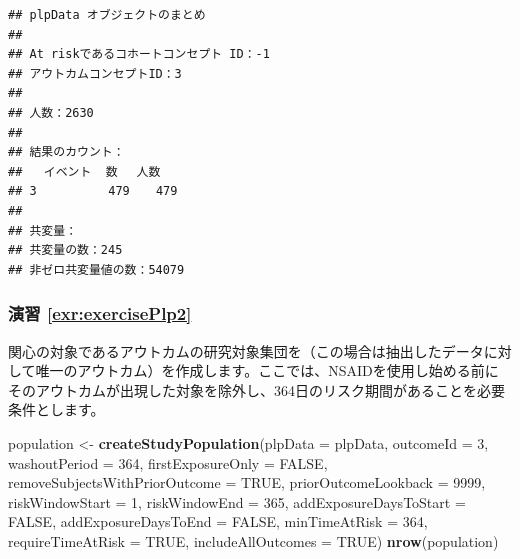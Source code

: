 \documentclass[
  11pt]{book}
\newenvironment{Shaded}{\begin{snugshade}}{\end{snugshade}}
\newcommand{\AttributeTok}[1]{\textcolor[rgb]{0.13,0.29,0.53}{#1}}
\newcommand{\ConstantTok}[1]{\textcolor[rgb]{0.56,0.35,0.01}{#1}}
\newcommand{\DecValTok}[1]{\textcolor[rgb]{0.00,0.00,0.81}{#1}}
\newcommand{\FunctionTok}[1]{\textcolor[rgb]{0.13,0.29,0.53}{\textbf{#1}}}
\newcommand{\NormalTok}[1]{#1}
\newcommand{\OtherTok}[1]{\textcolor[rgb]{0.56,0.35,0.01}{#1}}
\theoremstyle{definition}
\theoremstyle{definition}
\theoremstyle{definition}
\theoremstyle{definition}
\theoremstyle{remark}
\begin{document}
\begin{verbatim}
## plpData オブジェクトのまとめ
## 
## At riskであるコホートコンセプト ID：-1
## アウトカムコンセプトID：3
## 
## 人数：2630
## 
## 結果のカウント：
##   イベント  数 　人数
## 3          479  　479
## 
## 共変量：
## 共変量の数：245
## 非ゼロ共変量値の数：54079
\end{verbatim}

\subsubsection*{演習 \ref{exr:exercisePlp2}}\label{ux6f14ux7fd2-refexrexerciseplp2}

関心の対象であるアウトカムの研究対象集団を（この場合は抽出したデータに対して唯一のアウトカム）を作成します。ここでは、NSAIDを使用し始める前にそのアウトカムが出現した対象を除外し、364日のリスク期間があることを必要条件とします。

\begin{Shaded}
\begin{Highlighting}[]
\NormalTok{population }\OtherTok{\textless{}{-}} \FunctionTok{createStudyPopulation}\NormalTok{(}\AttributeTok{plpData =}\NormalTok{ plpData,}
                                    \AttributeTok{outcomeId =} \DecValTok{3}\NormalTok{,}
                                    \AttributeTok{washoutPeriod =} \DecValTok{364}\NormalTok{,}
                                    \AttributeTok{firstExposureOnly =} \ConstantTok{FALSE}\NormalTok{,}
                                    \AttributeTok{removeSubjectsWithPriorOutcome =} \ConstantTok{TRUE}\NormalTok{,}
                                    \AttributeTok{priorOutcomeLookback =} \DecValTok{9999}\NormalTok{,}
                                    \AttributeTok{riskWindowStart =} \DecValTok{1}\NormalTok{,}
                                    \AttributeTok{riskWindowEnd =} \DecValTok{365}\NormalTok{,}
                                    \AttributeTok{addExposureDaysToStart =} \ConstantTok{FALSE}\NormalTok{,}
                                    \AttributeTok{addExposureDaysToEnd =} \ConstantTok{FALSE}\NormalTok{,}
                                    \AttributeTok{minTimeAtRisk =} \DecValTok{364}\NormalTok{,}
                                    \AttributeTok{requireTimeAtRisk =} \ConstantTok{TRUE}\NormalTok{,}
                                    \AttributeTok{includeAllOutcomes =} \ConstantTok{TRUE}\NormalTok{)}
\FunctionTok{nrow}\NormalTok{(population)}
\end{Highlighting}
\end{Shaded}
\end{document}
